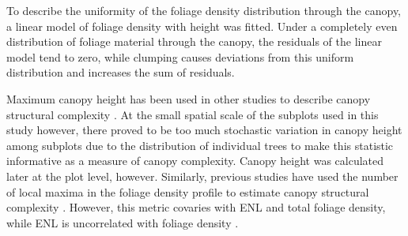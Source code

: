 \documentclass[11pt,a4paper]{article}
\begin{document}
To describe the uniformity of the foliage density distribution through the canopy, a linear model of foliage density with height was fitted. Under a completely even distribution of foliage material through the canopy, the residuals of the linear model tend to zero, while clumping causes deviations from this uniform distribution and increases the sum of residuals.

Maximum canopy height has been used in other studies to describe canopy structural complexity \citep{Scheuermann2018}. At the small spatial scale of the subplots used in this study however, there proved to be too much stochastic variation in canopy height among subplots due to the distribution of individual trees to make this statistic informative as a measure of canopy complexity. Canopy height was calculated later at the plot level, however. Similarly, previous studies have used the number of local maxima in the foliage density profile to estimate canopy structural complexity \citep{Wilkes2016}. However, this metric covaries with ENL and total foliage density, while ENL is uncorrelated with foliage density \citep{Ehbrecht2016}. 
\end{document}
